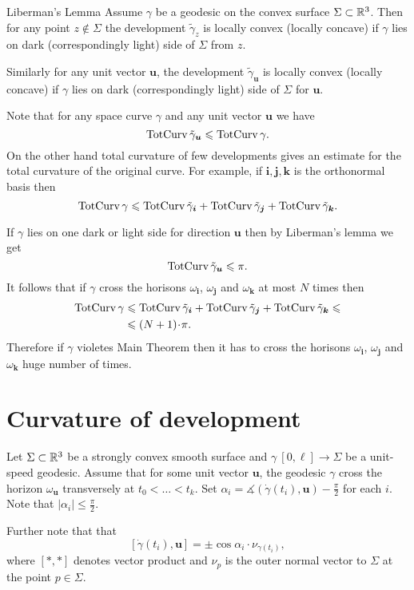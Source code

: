 \documentclass[a4paper,10pt]{amsart}
\begin{document}
\begin{thm}{Liberman's Lemma}\label{lem:liberman}
Assume $\gamma$ be a geodesic on the convex surface $\Sigma\subset \mathbb{R}^3$.
Then for any point $z\notin\Sigma$ the development $\tilde\gamma_z$ is locally convex (locally concave) if $\gamma$ lies on dark (correspondingly light) side of $\Sigma$ from $z$.

Similarly for any unit vector $\bm{u}$,
the development $\tilde\gamma_{\bm{u}}$ is locally convex (locally concave) if $\gamma$ lies on dark (correspondingly light) side of $\Sigma$ for $\bm{u}$.

\end{thm}

Note that for any space curve $\gamma$ and any unit vector $\bm{u}$
we have 
\[\mathop{\rm TotCurv}\nolimits\tilde\gamma_{\bm{u}}\leqslant\mathop{\rm TotCurv}\nolimits\gamma.\]
On the other hand total curvature of few developments gives an estimate 
for the total curvature of the original curve.
For example, if $\bm{i},\bm{j},\bm{k}$ is the orthonormal basis then
\[\mathop{\rm TotCurv}\nolimits\gamma
\leqslant
\mathop{\rm TotCurv}\nolimits\tilde\gamma_{\bm{i}}+\mathop{\rm TotCurv}\nolimits\tilde\gamma_{\bm{j}}+\mathop{\rm TotCurv}\nolimits\tilde\gamma_{\bm{k}}.\]

If $\gamma$ lies on one dark or light side for direction $\bm{u}$
then by Liberman's lemma we get 
\[\mathop{\rm TotCurv}\nolimits\tilde\gamma_{\bm{u}}\leqslant \pi.\]
It follows that if $\gamma$ cross the horisons $\omega_{\bm{i}}$, $\omega_{\bm{j}}$ and $\omega_{\bm{k}}$
at most $N$ times then 
\begin{align*}
\tc\gamma
&\le
\tc\tilde\gamma_{\bm{i}}
+\tc\tilde\gamma_{\bm{j}}
+\tc\tilde\gamma_{\bm{k}}
\le
\\
&\le(N+1)\cdot \pi.
\end{align*}
Therefore if $\gamma$ violetes Main Theorem then it has to cross the  horisons $\omega_{\bm{i}}$, $\omega_{\bm{j}}$ and $\omega_{\bm{k}}$ huge number of times.

\section{Curvature of development}\label{sec:curv-develop}

Let $\Sigma\subset\mathbb{R}^3$
be a strongly convex smooth surface
and $\gamma\:[0,\ell]\to \Sigma$ be a unit-speed geodesic.
Assume that for some unit vector $\bm{u}$,
the geodesic $\gamma$ cross the horizon $\omega_{\bm{u}}$ transversely at 
$t_0<\dots <t_k$.
Set $\alpha_i=\measuredangle(\dot\gamma(t_i),\bm{u})-\tfrac\pi2$ for each $i$.
Note that $|\alpha_i|\le\tfrac\pi2$.


Further note that that 
\[[\dot\gamma(t_i),\bm{u}]=\pm\cos\alpha_i\cdot\nu_{\gamma(t_i)},
\]
where $[{*},{*}]$ denotes vector product 
and $\nu_p$ is the outer normal vector to $\Sigma$ at the point $p\in\Sigma$.
\end{document}
